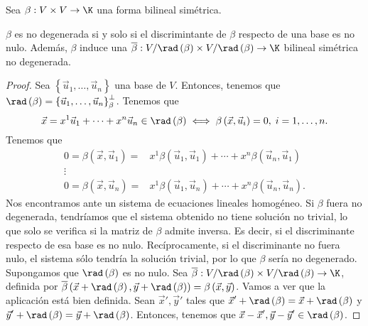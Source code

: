 Sea $\displaystyle \beta : V \times V \to \K $ una forma bilineal simétrica.
\begin{ftheorem}[]
\normalfont $\displaystyle \beta  $ es no degenerada si y solo si el discrimintante de $\displaystyle \beta  $ respecto de una base es no nulo. Además, $\displaystyle \beta  $ induce una $\displaystyle \overline{\beta} : V/ \rad\left(\beta \right) \times V / \rad\left(\beta \right) \to \K $ bilineal simétrica no degenerada.
\end{ftheorem}
\begin{proof}
	Sea $\displaystyle \left\{ \vec{u}_{1}, \ldots, \vec{u}_{n}\right\}  $ una base de $\displaystyle V $. Entonces, tenemos que $\displaystyle \rad\left(\beta \right) = \left\{ \vec{u}_{1}, \ldots, \vec{u}_{n}\right\} ^{\perp }_{\beta } $. Tenemos que
	\[\vec{x} = x^{1}\vec{u}_{1} + \cdots + x^{n}\vec{u}_{n} \in \rad\left(\beta \right) \iff \beta\left(\vec{x}, \vec{u}_{i}\right) = 0, \; i = 1, \ldots, n .\]
Tenemos que
\[
\begin{split}
0 =	\beta\left(\vec{x}, \vec{u}_{1}\right) = & x^{1}\beta \left(\vec{u}_{1}, \vec{u}_{1}\right) + \cdots + x^{n}\beta\left(\vec{u}_{n}, \vec{u}_{1}\right) \\
	\vdots \\
0 =	\beta\left(\vec{x}, \vec{u}_{n}\right) = & x^{1}\beta\left(\vec{u}_{1}, \vec{u}_{n}\right) + \cdots + x^{n}\beta\left(\vec{u}_{n}, \vec{u}_{n}\right).
\end{split}
\]
Nos encontramos ante un sistema de ecuaciones lineales homogéneo. Si $\displaystyle \beta  $ fuera no degenerada, tendríamos que el sistema obtenido no tiene solución no trivial, lo que solo se verifica si la matriz de $\displaystyle \beta  $ admite inversa. Es decir, si el discriminante respecto de esa base es no nulo. Recíprocamente, si el discriminante no fuera nulo, el sistema sólo tendría la solución trivial, por lo que $\displaystyle \beta $ sería no degenerado. \\ 
Supongamos que $\displaystyle \rad\left(\beta \right) $ es no nulo. Sea $\displaystyle \overline{\beta } : V/\rad\left(\beta \right) \times V/\rad\left(\beta\right) \to \K $, definida por $\displaystyle \overline{\beta }\left(\vec{x} + \rad\left(\beta \right), \vec{y} + \rad\left(\beta \right)\right) = \beta\left(\vec{x} , \vec{y}\right) $.
Vamos a ver que la aplicación está bien definida. Sean $\displaystyle \vec{x}', \vec{y}' $ tales que $\displaystyle \vec{x}' + \rad\left(\beta \right) = \vec{x} + \rad\left(\beta \right) $ y $\displaystyle \vec{y}' + \rad\left(\beta \right) = \vec{y} + \rad\left(\beta \right) $. Entonces, tenemos que $\displaystyle \vec{x}-\vec{x}', \vec{y}-\vec{y}' \in \rad\left(\beta\right) $.

\end{proof}
